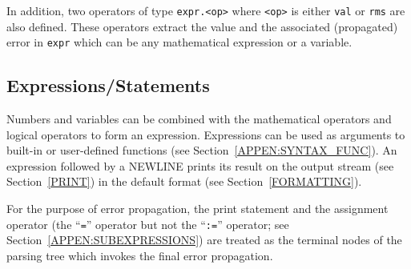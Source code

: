 \documentclass[12pt]{article}
\begin{document}
In addition, two operators of type {\tt expr.<op>} where {\tt <op>} is
either {\tt val} or {\tt rms} are also defined.  These operators
extract the value and the associated (propagated) error in {\tt expr}
which can be any mathematical expression or a variable.


\subsection{Expressions/Statements}
\label{APPEN:SYNTAX_EXPR}

Numbers and variables can be combined with the mathematical operators
and logical operators to form an expression.  Expressions can be used
as arguments to built-in or user-defined functions (see
Section~\ref{APPEN:SYNTAX_FUNC}).  An expression followed by a NEWLINE
prints its result on the output stream (see Section~\ref{PRINT}) in
the default format (see Section~\ref{FORMATTING}).

For the purpose of error propagation, the print statement and the
assignment operator (the ``{\tt =}'' operator but not the ``{\tt :=}''
operator; see Section~\ref{APPEN:SUBEXPRESSIONS}) are treated as the
terminal nodes of the parsing tree which invokes the final error
propagation.
\end{document}
